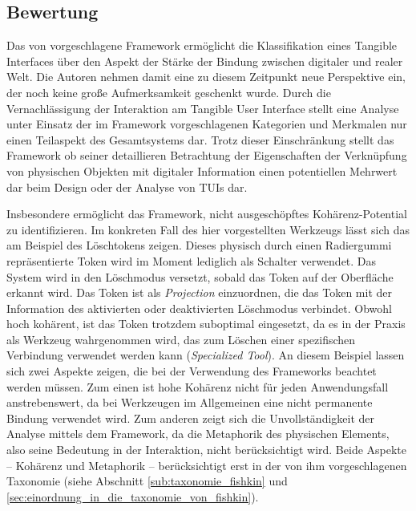 
\subsection{Bewertung} %
\label{sub:bewertung}

Das von \citep{Koleva03} vorgeschlagene Framework ermöglicht die Klassifikation eines Tangible Interfaces über den Aspekt der Stärke der Bindung zwischen digitaler und realer Welt. Die Autoren nehmen damit eine zu diesem Zeitpunkt neue Perspektive ein, der noch keine große Aufmerksamkeit geschenkt wurde. Durch die Vernachlässigung der Interaktion am Tangible User Interface stellt eine Analyse unter Einsatz der im Framework vorgeschlagenen Kategorien und Merkmalen nur einen Teilaspekt des Gesamtsystems dar. Trotz dieser Einschränkung stellt das Framework ob seiner detaillieren Betrachtung der Eigenschaften der Verknüpfung von physischen Objekten mit digitaler Information einen potentiellen Mehrwert dar beim Design oder der Analyse von \glspl{TUI} dar. 

Insbesondere ermöglicht das Framework, nicht ausgeschöpftes Kohärenz-Potential zu identifizieren. Im konkreten Fall des hier vorgestellten Werkzeugs lässt sich das am Beispiel des Löschtokens zeigen. Dieses physisch durch einen Radiergummi repräsentierte Token wird im Moment lediglich als Schalter verwendet. Das System wird in den Löschmodus versetzt, sobald das Token auf der Oberfläche erkannt wird. Das Token ist als \emph{Projection} einzuordnen, die das Token mit der Information des aktivierten oder deaktivierten Löschmodus verbindet. Obwohl hoch kohärent, ist das Token trotzdem suboptimal eingesetzt, da es in der Praxis als Werkzeug wahrgenommen wird, das zum Löschen einer spezifischen Verbindung verwendet werden kann (\emph{Specialized Tool}). An diesem Beispiel lassen sich zwei Aspekte zeigen, die bei der Verwendung des Frameworks beachtet werden müssen. Zum einen ist hohe Kohärenz nicht für jeden Anwendungsfall anstrebenswert, da bei Werkzeugen im Allgemeinen eine nicht permanente Bindung verwendet wird. Zum anderen zeigt sich die Unvollständigkeit der Analyse mittels dem Framework, da die Metaphorik des physischen Elements, also seine Bedeutung in der Interaktion, nicht berücksichtigt wird. Beide Aspekte -- Kohärenz und Metaphorik -- berücksichtigt erst \citep{Fishkin04} in der von ihm vorgeschlagenen Taxonomie (siehe Abschnitt \ref{sub:taxonomie_fishkin} und \ref{sec:einordnung_in_die_taxonomie_von_fishkin}).

